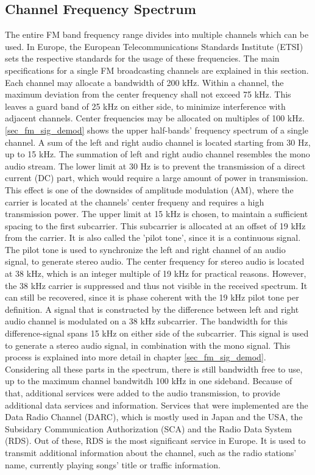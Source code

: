 \documentclass[conference]{IEEEtran}
\begin{document}
  \subsection{Channel Frequency Spectrum}
    The entire FM band frequency range divides into multiple channels which can be used.
    In Europe, the European Telecommunications Standards Institute (ETSI) sets the respective standards for the usage of these frequencies.
    The main specifications for a single FM broadcasting channels are explained in this section.
    Each channel may allocate a bandwidth of 200 kHz.
    Within a channel, the maximum deviation from the center frequency shall not exceed 75 kHz.
    This leaves a guard band of 25 kHz on either side, to minimize interference with adjacent channels.
    Center frequencies may be allocated on multiples of 100 kHz.
    \ref{sec_fm_sig_demod} shows the upper half-bands' frequency spectrum of a single channel.
    A sum of the left and right audio channel is located starting from 30 Hz, up to 15 kHz.
    The summation of left and right audio channel resembles the mono audio stream.
    The lower limit at 30 Hz is to prevent the transmission of a direct current (DC) part, which would require a large amount of power in transmission. This effect is one of the downsides of amplitude modulation (AM), where the carrier is located at the channels' center frequeny and requires a high transmission power. %
    The upper limit at 15 kHz is chosen, to maintain a sufficient spacing to the first subcarrier.
    This subcarrier is allocated at an offset of 19 kHz from the carrier.
    It is also called the 'pilot tone', since it is a continuous signal.
    The pilot tone is used to synchronize the left and right channel of an audio signal, to generate stereo audio.
    The center frequency for stereo audio is located at 38 kHz, which is an integer multiple of 19 kHz for practical reasons.
    However, the 38 kHz carrier is suppressed and thus not visible in the received spectrum.
    It can still be recovered, since it is phase coherent with the 19 kHz pilot tone per definition.
    A signal that is constructed by the difference between left and right audio channel is modulated on a 38 kHz subcarrier.
    The bandwidth for this difference-signal spans 15 kHz on either side of the subcarrier.
    This signal is used to generate a stereo audio signal, in combination with the mono signal.
    This process is explained into more detail in chapter \ref{sec_fm_sig_demod}.
    Considering all these parts in the spectrum, there is still bandwidth free to use, up to the maximum channel bandwitdh 100 kHz in one sideband.
    Because of that, additional services were added to the audio transmission, to provide additional data services and information.
    Services that were implemented are the Data Radio Channel (DARC), which is mostly used in Japan and the USA, the Subsidary Communication Authorization (SCA) and the Radio Data System (RDS).
    Out of these, RDS is the most significant service in Europe.
    It is used to transmit additional information about the channel, such as the radio stations' name, currently playing songs' title or traffic information.
\end{document}
